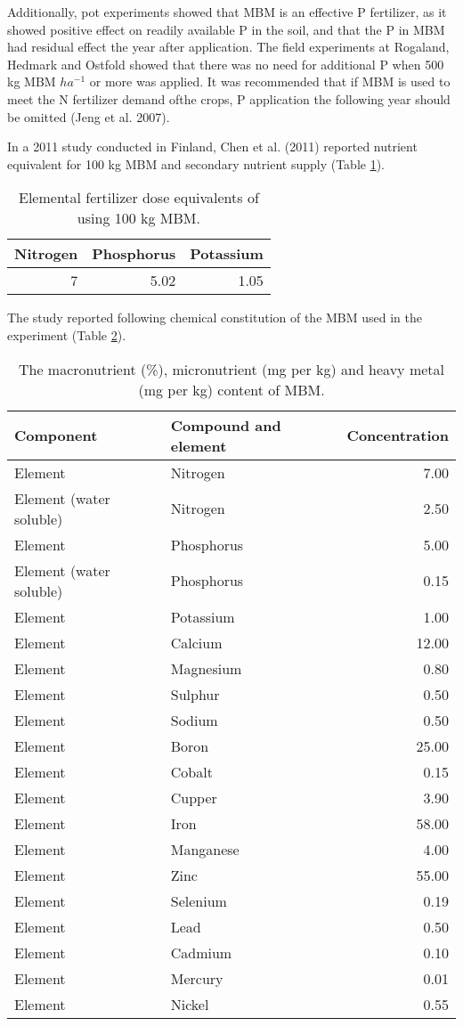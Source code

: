 \documentclass[
]{article}
\begin{document}
Additionally, pot experiments showed that MBM is an effective P fertilizer, as it showed positive effect on readily available P in the soil, and that the P in MBM had residual effect the year after application. The field experiments at Rogaland, Hedmark and Ostfold showed that there was no need for additional P when 500 kg MBM \(ha^{-1}\) or more was applied. It was recommended that if MBM is used to meet the N fertilizer demand ofthe crops, P application the following year should be omitted (Jeng et al. 2007).

In a 2011 study conducted in Finland, Chen et al. (2011) reported nutrient equivalent for 100 kg MBM and secondary nutrient supply (Table \ref{tab:nitrogen-100-supplemental-mbm}).

\begin{longtable}[t]{rrr}
\caption{\label{tab:nitrogen-100-supplemental-mbm}Elemental fertilizer dose equivalents of using 100 kg MBM.}\\
\toprule
Nitrogen & Phosphorus & Potassium\\
\midrule
7 & 5.02 & 1.05\\
\bottomrule
\end{longtable}

The study reported following chemical constitution of the MBM used in the experiment (Table \ref{tab:constitution-mbm-finland}).

\begin{longtable}[t]{llr}
\caption{\label{tab:constitution-mbm-finland}The macronutrient (\%), micronutrient (mg per kg) and heavy metal (mg per kg) content of MBM.}\\
\toprule
Component & Compound and element & Concentration\\
\midrule
Element & Nitrogen & 7.00\\
Element (water soluble) & Nitrogen & 2.50\\
Element & Phosphorus & 5.00\\
Element (water soluble) & Phosphorus & 0.15\\
Element & Potassium & 1.00\\
\addlinespace
Element & Calcium & 12.00\\
Element & Magnesium & 0.80\\
Element & Sulphur & 0.50\\
Element & Sodium & 0.50\\
Element & Boron & 25.00\\
\addlinespace
Element & Cobalt & 0.15\\
Element & Cupper & 3.90\\
Element & Iron & 58.00\\
Element & Manganese & 4.00\\
Element & Zinc & 55.00\\
\addlinespace
Element & Selenium & 0.19\\
Element & Lead & 0.50\\
Element & Cadmium & 0.10\\
Element & Mercury & 0.01\\
Element & Nickel & 0.55\\
\bottomrule
\end{longtable}
\end{document}

